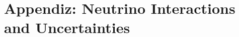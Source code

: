 \section{Appendiz: Neutrino Interactions and Uncertainties}\label{sec:nu-osc-11} \label{sec:physics-lbnosc-nuint-app}
